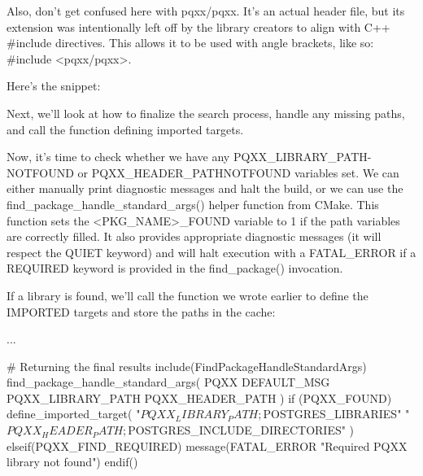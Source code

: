 Also, don’t get confused here with pqxx/pqxx. It’s an actual header file, but its extension was intentionally left off by the library creators to align with C++ \#include directives. This allows it to be used with angle brackets, like so: \#include <pqxx/pqxx>.

Here’s the snippet:



Next, we’ll look at how to finalize the search process, handle any missing paths, and call the function defining imported targets.


Now, it’s time to check whether we have any PQXX\_LIBRARY\_PATH-NOTFOUND or PQXX\_HEADER\_PATHNOTFOUND variables set. We can either manually print diagnostic messages and halt the build, or we can use the find\_package\_handle\_standard\_args() helper function from CMake. This function sets the <PKG\_NAME>\_FOUND variable to 1 if the path variables are correctly filled. It also provides appropriate diagnostic messages (it will respect the QUIET keyword) and will halt execution with a FATAL\_ERROR if a REQUIRED keyword is provided in the find\_package() invocation.

If a library is found, we’ll call the function we wrote earlier to define the IMPORTED targets and store the paths in the cache:


\begin{cmake}
...

# Returning the final results
include(FindPackageHandleStandardArgs)
find_package_handle_standard_args(
    PQXX DEFAULT_MSG PQXX_LIBRARY_PATH PQXX_HEADER_PATH
)
if (PQXX_FOUND)
    define_imported_target(
        "${PQXX_LIBRARY_PATH};${POSTGRES_LIBRARIES}"
        "${PQXX_HEADER_PATH};${POSTGRES_INCLUDE_DIRECTORIES}"
    )
elseif(PQXX_FIND_REQUIRED)
    message(FATAL_ERROR "Required PQXX library not found")
endif()
\end{cmake}

